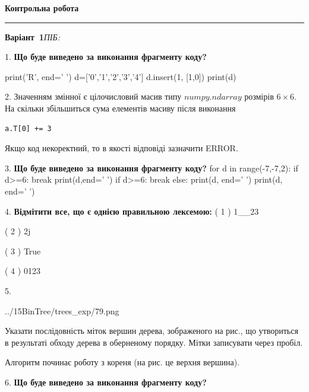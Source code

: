 \documentclass[11pt]{article}
\begin{document}
{\centering\Large\bfseries Контрольна робота\par}
\medskip
\noindent\rule{\linewidth}{0.5pt}
\smallskip
\noindent\textbf{Варіант \No\,1}\hfill \textit{ПІБ:}\,\underline{\hspace{60mm}}
\vspace{4mm}

1. \textbf{Що буде виведено за виконання фрагменту коду?}

print('R', end=' ')
d=['0','1','2','3','4']
d.insert(1, [1,0])
print(d)

\par\vspace{5mm}
2. 
Значенням змінної  є цілочисловий масив типу $numpy.ndarray$ розмірів $6{\times}6$. На скільки збільшиться сума елементів масиву  після виконання
\begin{verbatim}
a.T[0] += 3
\end{verbatim}


Якщо код некоректний, то в якості відповіді зазначити ERROR.


\par\vspace{5mm}
3. \textbf{Що буде виведено за виконання фрагменту коду?}
for d in range(-7,-7,2):
    if d>=6:
        break
        print(d,end=' ')
    if d>=6:
        break
else:
    print(d, end=' ')
print(d, end=' ')
\par\vspace{5mm}
4. %
\textbf{Відмітити все, що є однією правильною лексемою:}
( 1 ) 1__23

( 2 ) 2j

( 3 ) True

( 4 ) 0123
\par\vspace{5mm}
5. 

\begin{center}
	{../15BinTree/trees_exp/79.png}
\end{center}
Указати послідовність міток вершин дерева, зображеного на рис., що утвориться в результаті обходу дерева в оберненому порядку. Мітки записувати через пробіл.\par Алгоритм починає роботу з кореня (на рис. це верхня вершина).
\par\vspace{5mm}
6. \textbf{Що буде виведено за виконання фрагменту коду?}
\end{document}
